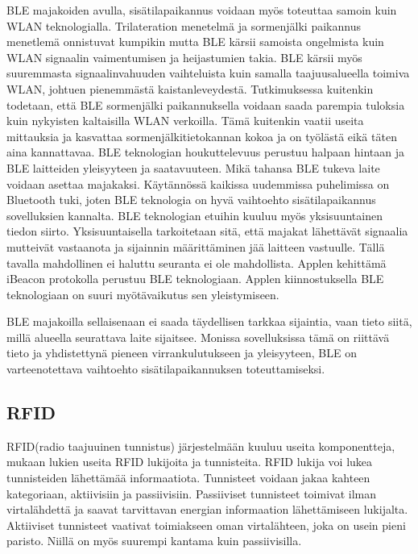 BLE majakoiden avulla, sisätilapaikannus voidaan myös toteuttaa samoin kuin WLAN teknologialla\cite{BLE}. Trilateration menetelmä ja sormenjälki paikannus menetlemä onnistuvat kumpikin mutta BLE kärsii samoista ongelmista kuin WLAN signaalin vaimentumisen ja heijastumien takia. BLE kärsii myös suuremmasta signaalinvahuuden vaihteluista kuin samalla taajuusalueella toimiva WLAN, johtuen pienemmästä kaistanleveydestä\cite{BLE}. Tutkimuksessa\cite{BLE} kuitenkin todetaan, että BLE sormenjälki paikannuksella voidaan saada parempia tuloksia kuin nykyisten kaltaisilla WLAN verkoilla. Tämä kuitenkin vaatii useita mittauksia ja kasvattaa sormenjälkitietokannan kokoa ja on työlästä eikä täten aina kannattavaa.
BLE teknologian houkuttelevuus perustuu halpaan hintaan ja BLE laitteiden yleisyyteen ja saatavuuteen. Mikä tahansa BLE tukeva laite voidaan asettaa majakaksi.\cite{BLE} Käytännössä kaikissa uudemmissa puhelimissa on Bluetooth tuki, joten BLE teknologia on hyvä vaihtoehto sisätilapaikannus sovelluksien kannalta. BLE teknologian etuihin kuuluu myös yksisuuntainen tiedon siirto. Yksisuuntaisella tarkoitetaan sitä, että majakat lähettävät signaalia mutteivät vastaanota ja sijainnin määrittäminen jää laitteen vastuulle. Tällä tavalla mahdollinen ei haluttu seuranta ei ole mahdollista. Applen kehittämä iBeacon protokolla perustuu BLE teknologiaan\cite{bluesentinel}. Applen kiinnostuksella BLE teknologiaan on suuri myötävaikutus sen yleistymiseen.



BLE majakoilla sellaisenaan ei saada täydellisen tarkkaa sijaintia, vaan tieto siitä, millä alueella seurattava laite sijaitsee. Monissa sovelluksissa tämä on riittävä tieto ja yhdistettynä pieneen virrankulutukseen ja yleisyyteen, BLE on varteenotettava vaihtoehto sisätilapaikannuksen toteuttamiseksi. 
\subsection{RFID}
RFID(radio taajuuinen tunnistus) järjestelmään kuuluu useita komponentteja, mukaan lukien useita RFID lukijoita ja tunnisteita. RFID lukija voi lukea tunnisteiden lähettämää informaatiota. Tunnisteet voidaan jakaa kahteen kategoriaan, aktiivisiin ja passiivisiin. Passiiviset tunnisteet toimivat ilman virtalähdettä ja saavat tarvittavan energian informaation lähettämiseen lukijalta. Aktiiviset tunnisteet vaativat toimiakseen oman virtalähteen, joka on usein pieni paristo. Niillä on myös suurempi kantama kuin passiivisilla.\cite{E}

